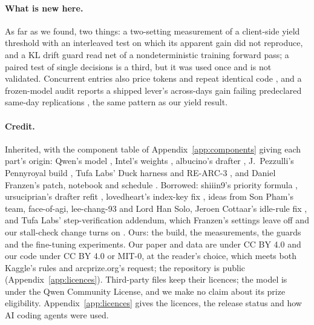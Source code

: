 \paragraph{What is new here.}
As far as we found, two things: a two-setting measurement of a client-side yield threshold with an interleaved test on which its apparent gain did not reproduce, and a KL drift guard read net of a nondeterministic training forward pass; a paired test of single decisions is a third, but it was used once and is not validated. Concurrent entries also price tokens \citep{lavin2026points} and repeat identical code \citep{guoyi2026repeat,shah2026lottery}, and a frozen-model audit reports a shipped lever's across-days gain failing predeclared same-day replications \citep{damnventures2026frozen}, the same pattern as our yield result.

\paragraph{Credit.}
Inherited, with the component table of Appendix~\ref{app:components} giving each part's origin: Qwen's model \citep{qwen38flashnext}, Intel's weights \citep{intel2026w4a16}, albucino's drafter \citep{albucino2026drafter}, J.~Pezzulli's Pennyroyal build \citep{pezzulli2026pennyroyal}, Tufa Labs' Duck harness and RE-ARC-3 \citep{bessis2026duck,tufalabs2026rearc3}, and Daniel Franzen's patch, notebook and schedule \citep{franzen2026milestone2,franzen2026writeup}. %
Borrowed: shiiin9's priority formula \citep{shiiin92026dprime}, ursuciprian's drafter refit \citep{ursuciprian2026d3}, lovedheart's index-key fix \citep{lovedheart2026qsa}, ideas from Son Pham's team, face-of-agi, lee-chang-93 and Lord Han Solo, Jeroen Cottaar's idle-rule fix \citep{cottaar2026forum750173}, and Tufa Labs' step-verification addendum, which Franzen's settings leave off and our stall-check change turns on \citep{bessis2026duck}. %
Ours: the build, the measurements, the guards and the fine-tuning experiments. %
Our paper and data are under CC BY 4.0 and our code under CC BY 4.0 or MIT-0, at the reader's choice, which meets both Kaggle's rules and arcprize.org's request; the repository is public (Appendix~\ref{app:licences}). Third-party files keep their licences; the model is under the Qwen Community License, and we make no claim about its prize eligibility. %
Appendix~\ref{app:licences} gives the licences, the release status and how AI coding agents were used.
